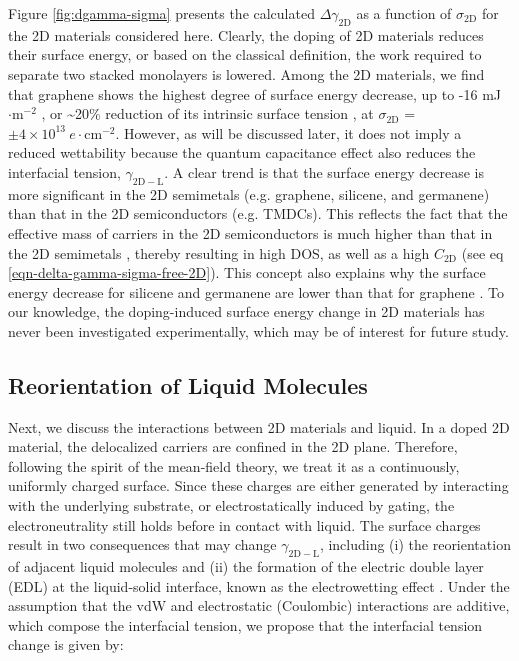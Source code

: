 \documentclass[journal=jacsat,manuscript=article,email=true,hyperref=true,keywords=true]{achemso}
\begin{document}
Figure \ref{fig:dgamma-sigma} presents the calculated \(\Delta
\gamma_{\mathrm{2D}}\) as a function of \(\sigma_{\mathrm{2D}}\) for the
2D materials considered here. Clearly, the doping of 2D materials
reduces their surface energy, or based on the classical definition,
the work required to separate two stacked monolayers is lowered. Among
the 2D materials, we find that graphene shows the highest degree of
surface energy decrease, up to -16 mJ\(\cdot \mathrm{m}^{-2}\) , or
\textasciitilde{}20\% reduction of its intrinsic surface tension
\cite{shih_wetting_2013}, at \(\sigma_{\mathrm{2D}}\) = \(\pm
4\times10^{13}\ e\cdot \mathrm{cm}^{-2}\). However, as will be
discussed later, it does not imply a reduced wettability because the
quantum capacitance effect also reduces the interfacial tension,
\(\gamma_{\mathrm{2D-L}}\). A clear trend is that the surface energy
decrease is more significant in the 2D semimetals (e.g. graphene,
silicene, and germanene) than that in the 2D semiconductors
(e.g. TMDCs). This reflects the fact that the effective mass of
carriers in the 2D semiconductors is much higher than that in the 2D
semimetals \cite{davies_two-dimensional_1997}, thereby resulting in
high DOS, as well as a high \(C_{\mathrm{2D}}\) (see eq
\ref{eqn-delta-gamma-sigma-free-2D}). This concept also explains why the
surface energy decrease for silicene and germanene are lower than
that for graphene \cite{Yan_2013}.  To our knowledge, the doping-induced
surface energy change in 2D materials has never been investigated
experimentally, which may be of interest for future study.


\subsection{Reorientation of Liquid Molecules}
\label{sec:org8d3c56f}

Next, we discuss the interactions between 2D materials and liquid. In
a doped 2D material, the delocalized carriers are confined in the 2D
plane. Therefore, following the spirit of the mean-field theory, we
treat it as a continuously, uniformly charged surface. Since these
charges are either generated by interacting with the underlying
substrate, or electrostatically induced by gating, the
electroneutrality still holds before in contact with liquid. The
surface charges result in two consequences that may change
\(\gamma_{\mathrm{2D-L}}\), including (i) the reorientation of adjacent
liquid molecules \cite{ostrowski_tunable_2014} and (ii) the formation of
the electric double layer (EDL) at the liquid-solid interface, known
as the electrowetting effect
\cite{Lippmann_1908,mugele_electrowetting:_2005}. Under the assumption
that the vdW and electrostatic (Coulombic) interactions are additive,
which compose the interfacial tension, we propose that the
interfacial tension change is given by:
\end{document}
